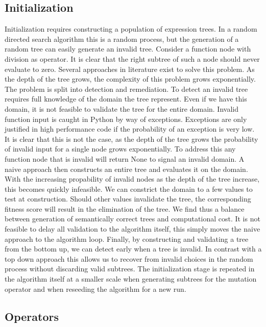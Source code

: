 \documentclass[10pt]{extarticle}
\begin{document}
\subsection{Initialization}
Initialization requires constructing a population of expression trees. In a random directed search algorithm this is a random process, but the generation of a random tree can easily generate an invalid tree. Consider a function node with division as operator. It is clear that the right subtree of such a node should never evaluate to zero. 
Several approaches in literature exist %
to solve this problem.
As the depth of the tree grows, the complexity of this problem grows exponentially.
The problem is split into detection and remediation.
To detect an invalid tree requires full knowledge of the domain the tree represent. Even if we have this domain, it is not feasible to validate the tree for the entire domain. 
Invalid function input is caught in Python by way of exceptions. 
Exceptions are only justified in high performance code if the probability of an exception is very low. 
It is clear that this is not the case, as the depth of the tree grows the probability of invalid input for a single node grows exponentially. To address this any function node that is invalid will return None to signal an invalid domain.
A naive approach then constructs an entire tree and evaluates it on the domain. 
With the increasing propability of invalid nodes as the depth of the tree increase, this becomes quickly infeasible.
We can constrict the domain to a few values to test at construction. 
Should other values invalidate the tree, the corresponding fitness score will result in the elimination of the tree.
We find thus a balance between generation of semantically correct trees and computational cost. 
It is not feasible to delay all validation to the algorithm itself, this simply moves the naive approach to the algorithm loop.
Finally, by constructing and validating a tree from the bottom up, we can detect early when a tree is invalid. 
In contrast with a top down approach this allows us to recover from invalid choices in the random process without discarding valid subtrees.
The initialization stage is repeated in the algorithm itself at a smaller scale when generating subtrees for the mutation operator and when reseeding the algorithm for a new run.

\subsection{Operators}
\end{document}
